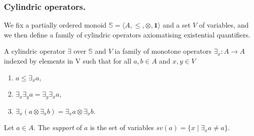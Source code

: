\documentclass{llncs}
\newcommand{\comment}[1]{}
\def\monid{{\mathbf 0}}
\def\monop{\otimes}
\def\monid{\mathbf{1}}
\begin{document}
\comment{\smallskip
Our first step is the introduction of a technical notion that allows for 
factorising the common properties in the definition of the two families of operators.

\begin{definition}[pomonoid action]
\label{pomo}
Let $\mathbb{M} = \langle A, \leq, \monop, \monid \rangle$ be a partially ordered monoid and $\mathbb{P} = \langle S, \leq \rangle$ a partial order.
A pomonoid action of $\mathbb{M}$ on $\mathbb{P}$ is a function $\phi: A \times S \rightarrow S$ such that
	\begin{itemize}
	     \item $\forall s \in S.\ \phi(\monid, s) = s$,
         \item $\forall a, b \in A,\ s \in S.\ \phi(a, \phi(b, s)) = \phi(a \otimes b, s)$,
         \item $\forall a, b \in A,\ s, t \in S.\ a \leq b\, \wedge\, s \leq t \implies \phi(a, s) 
         \leq \phi (b, t)$.
	\end{itemize}
\end{definition}

The first two requirements just state
that $\phi$ is a monoid action of $\mathbb{M}$ on $S$, while the latter states that $\phi$ is monotone. Sometimes, we say that $\mathbb{P}$ is an $\mathbb{M}$-PO.}

\subsubsection{Cylindric operators.}
We fix a partially ordered monoid $\mathbb{S} = \langle A, \leq, \monop, \monid \rangle$
and a set $V$ of variables, and we then define a family of cylindric operators axiomatising existential quantifiers.

\begin{definition}[cylindrification]\label{cyli}
	A cylindric operator $\exists$ over $\mathbb{S}$ and $V$ ia family of monotone operators
	$\exists_x : A \rightarrow A$ indexed by elements in V such that for all 
	$a, b \in A$ and $x, y \in V$
	\begin{enumerate}
	     \item $a \leq \exists_x a$,
         \item $\exists_x \exists_y a = \exists_y \exists_x a$,
	     \item $\exists_x (a \monop \exists_x b) = \exists_x a \monop \exists_x b$.
	\end{enumerate}
	
	\noindent Let $a \in A$. The \emph{support} of $a$ is the set of variables 
	$sv(a) = \{ x \mid \exists_x a \neq a\}$. 
\end{definition}
\end{document}
